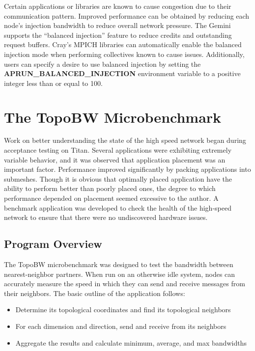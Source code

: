 \documentclass[10pt, conference, compsocconf]{IEEEtran}
\begin{document}
Certain applications or libraries are known to cause congestion due to their
communication pattern.  Improved performance can be obtained by reducing each
node's injection bandwidth to reduce overall network pressure.  The Gemini
supports the ``balanced injection'' feature to reduce credits and outstanding
request buffers.  Cray's MPICH libraries can automatically enable the balanced
injection mode when performing collectives known to cause issues.
Additionally, users can specify a desire to use balanced injection by setting
the \textbf{APRUN\_BALANCED\_INJECTION} environment variable to a positive
integer less than or equal to 100.

\section{The TopoBW Microbenchmark}

Work on better understanding the state of the high speed network began during
acceptance testing on Titan.  Several applications were exhibiting extremely
variable behavior, and it was observed that application placement was an
important factor.  Performance improved significantly by packing applications
into submeshes.  Though it is obvious that optimally placed application have
the ability to perform better than poorly placed ones, the degree to which
performance depended on placement seemed excessive to the author.  A benchmark
application was developed to check the health of the high-speed network to
ensure that there were no undiscovered hardware issues.

\subsection{Program Overview}

The TopoBW microbenchmark was designed to test the bandwidth between
nearest-neighbor partners.  When run on an otherwise idle system, nodes can
accurately measure the speed in which they can send and receive messages from
their neighbors.  The basic outline of the application follows:

\begin{itemize}
	\item Determine its topological coordinates and find its topological neighbors
	\item For each dimension and direction, send and receive from its neighbors
	\item Aggregate the results and calculate minimum, average, and max bandwidths
\end{itemize}
\end{document}
